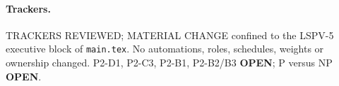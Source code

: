 \documentclass[11pt]{article}
\begin{document}
\paragraph{Trackers.} TRACKERS REVIEWED; MATERIAL CHANGE confined to the LSPV-5 executive block of
\texttt{main.tex}. No automations, roles, schedules, weights or ownership changed.
P2-D1, P2-C3, P2-B1, P2-B2/B3 \textbf{OPEN}; P versus NP \textbf{OPEN}.

\end{document}
